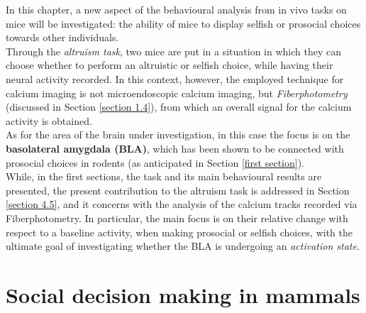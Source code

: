 \documentclass[12pt, a4paper]{report}
\begin{document}
In this chapter, a new aspect of the behavioural analysis from in vivo tasks on mice will be investigated: the ability of mice to display selfish or prosocial choices towards other individuals.\\
Through the \textit{altruism task}, two mice are put in a situation in which they can choose whether to perform an altruistic or selfish choice, while having their neural activity recorded. In this context, however, the employed technique for calcium imaging is not microendoscopic calcium imaging, but \textit{Fiberphotometry} (discussed in Section \ref{section 1.4}), from which an overall signal for the calcium activity is obtained.\\
As for the area of the brain under investigation, in this case the focus is on the \textbf{basolateral amygdala (BLA)}, which has been shown to be connected with prosocial choices in rodents (as anticipated in Section \ref{first section}).\\
While, in the first sections, the task and its main behavioural results are presented, the present contribution to the altruism task is addressed in Section \ref{section 4.5}, and it concerns with the analysis of the calcium tracks recorded via Fiberphotometry. In particular, the main focus is on their relative change with respect to a baseline activity, when making prosocial or selfish choices, with the ultimate goal of investigating whether the BLA is undergoing an \textit{activation state}.


 


\section{Social decision making in mammals}
\end{document}
